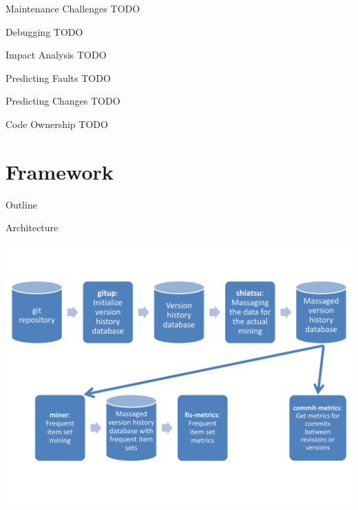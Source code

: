 \begin{frame}{Maintenance Challenges}
  TODO
\end{frame}


\begin{frame}{Debugging}
  TODO
\end{frame}


\begin{frame}{Impact Analysis}
  TODO
\end{frame}


\begin{frame}{Predicting Faults}
  TODO
\end{frame}


\begin{frame}{Predicting Changes}
  TODO
\end{frame}


\begin{frame}{Code Ownership}
  TODO
\end{frame}



\section{Framework}

\begin{frame}{Outline}
  \tableofcontents[current]
\end{frame}


\begin{frame}{Architecture}

  \begin{center}
    \includegraphics[width=\textwidth]{figures/miner-architecture}
  \end{center}

\end{frame}

